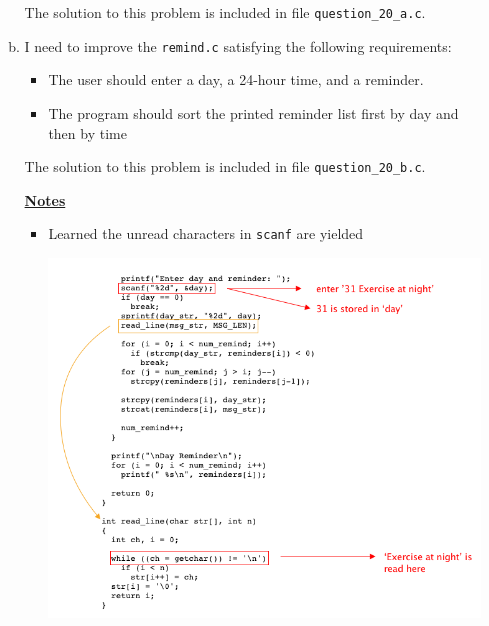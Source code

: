 \documentclass[12pt]{article}
\begin{document}
\begin{enumerate}[1.]
\begin{enumerate}[a)]
        \bigskip

        The solution to this problem is included in file \texttt{question\_20\_a.c}.

        \bigskip

        \item

        I need to improve the \texttt{remind.c} satisfying the following requirements:

        \begin{itemize}
            \item The user should enter a day, a 24-hour time, and a reminder.
            \item The program should sort the printed reminder list first by day and then by time
        \end{itemize}

        \bigskip

        The solution to this problem is included in file \texttt{question\_20\_b.c}.

        \bigskip

        \underline{\textbf{Notes}}

        \begin{itemize}
            \item Learned the unread characters in \texttt{scanf} are yielded

            \bigskip

            \begin{center}
            \includegraphics[width=0.9\linewidth]{images/review_6_solution_8.png}
            \end{center}
        \end{itemize}


\end{enumerate}
\end{enumerate}
\end{document}
